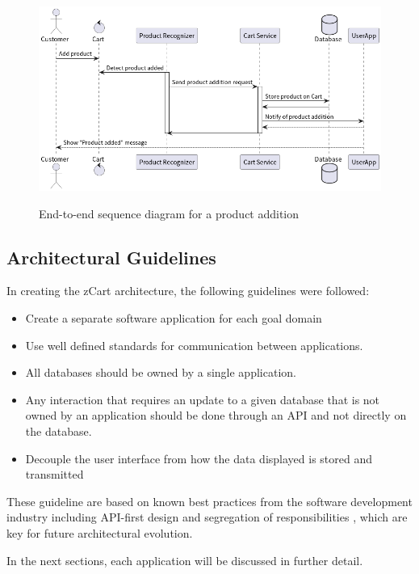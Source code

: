 \begin{figure}[H]
	\centering
	\caption[End-to-end sequence diagram for a product addition]{End-to-end sequence diagram for a product addition}
    \includegraphics[width=1\textwidth]{./images/E2E.png}
	\fonte{}
	\label{fig:e2eseq}
\end{figure}

\subsection{Architectural Guidelines}
In creating the zCart architecture, the following guidelines were followed:

\begin{itemize}
    \item Create a separate software application for each goal domain
    \item Use well defined standards for communication between applications.
    \item All databases should be owned by a single application. 
    \item Any interaction that requires an update to a given database that is
        not owned by an application should be done through an API and not
        directly on the database.
    \item Decouple the user interface from how the data displayed is stored and transmitted
\end{itemize}

These guideline are based on known best practices from the software 
development industry including API-first design and segregation of
responsibilities \cite{Sam2021,Kong2022}, which are key for future architectural
evolution.

In the next sections, each application will be discussed in further detail.

